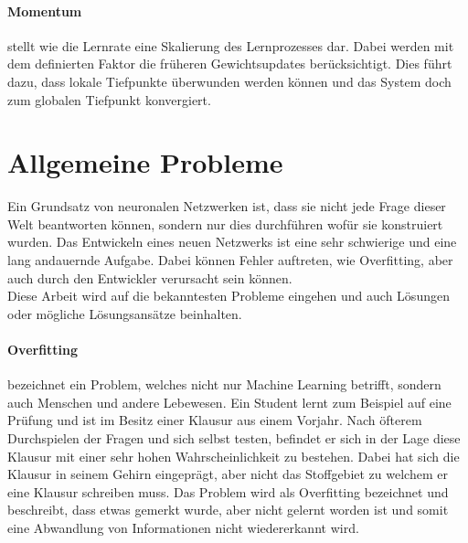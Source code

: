 \paragraph{Momentum} stellt wie die Lernrate eine Skalierung des Lernprozesses dar.
Dabei werden mit dem definierten Faktor die früheren Gewichtsupdates berücksichtigt. 
Dies führt dazu, dass lokale Tiefpunkte überwunden werden können und das System doch zum globalen Tiefpunkt konvergiert.

\section{Allgemeine Probleme}
\label{sec:AllgeProb}

Ein Grundsatz von neuronalen Netzwerken ist, dass sie nicht jede Frage dieser Welt beantworten können, sondern nur dies durchführen wofür sie konstruiert wurden. 
Das Entwickeln eines neuen Netzwerks ist eine sehr schwierige und eine lang andauernde Aufgabe. 
Dabei können Fehler auftreten, wie Overfitting, aber auch durch den Entwickler verursacht sein können. \\


\noindent
Diese Arbeit wird auf die bekanntesten Probleme eingehen und auch Lösungen oder mögliche Lösungsansätze beinhalten. 


\paragraph{Overfitting} bezeichnet ein Problem, welches nicht nur Machine Learning betrifft, sondern auch Menschen und andere Lebewesen. 
Ein Student lernt zum Beispiel auf eine Prüfung und ist im Besitz einer Klausur aus einem Vorjahr. 
Nach öfterem Durchspielen der Fragen und sich selbst testen, befindet er sich in der Lage diese Klausur mit einer sehr hohen Wahrscheinlichkeit zu bestehen. 
Dabei hat sich die Klausur in seinem Gehirn eingeprägt, aber nicht das Stoffgebiet zu welchem er eine Klausur schreiben muss. 
Das Problem wird als Overfitting bezeichnet und beschreibt, dass etwas gemerkt wurde, aber nicht gelernt worden ist und somit eine Abwandlung von Informationen nicht wiedererkannt wird.

